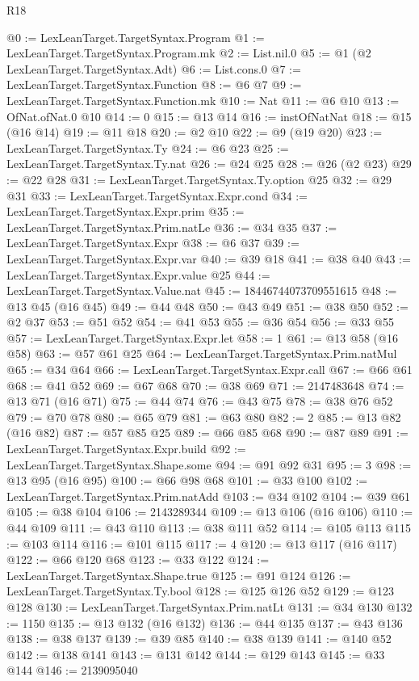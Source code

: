 \begin{lexlean}{R18}
\begin{coremodule}
@0 := LexLeanTarget.TargetSyntax.Program
@1 := LexLeanTarget.TargetSyntax.Program.mk
@2 := List.nil.{0}
@5 := @1 (@2 LexLeanTarget.TargetSyntax.Adt)
@6 := List.cons.{0}
@7 := LexLeanTarget.TargetSyntax.Function
@8 := @6 @7
@9 := LexLeanTarget.TargetSyntax.Function.mk
@10 := Nat
@11 := @6 @10
@13 := OfNat.ofNat.{0} @10
@14 := 0
@15 := @13 @14
@16 := instOfNatNat
@18 := @15 (@16 @14)
@19 := @11 @18
@20 := @2 @10
@22 := @9 (@19 @20)
@23 := LexLeanTarget.TargetSyntax.Ty
@24 := @6 @23
@25 := LexLeanTarget.TargetSyntax.Ty.nat
@26 := @24 @25
@28 := @26 (@2 @23)
@29 := @22 @28
@31 := LexLeanTarget.TargetSyntax.Ty.option @25
@32 := @29 @31
@33 := LexLeanTarget.TargetSyntax.Expr.cond
@34 := LexLeanTarget.TargetSyntax.Expr.prim
@35 := LexLeanTarget.TargetSyntax.Prim.natLe
@36 := @34 @35
@37 := LexLeanTarget.TargetSyntax.Expr
@38 := @6 @37
@39 := LexLeanTarget.TargetSyntax.Expr.var
@40 := @39 @18
@41 := @38 @40
@43 := LexLeanTarget.TargetSyntax.Expr.value @25
@44 := LexLeanTarget.TargetSyntax.Value.nat
@45 := 18446744073709551615
@48 := @13 @45 (@16 @45)
@49 := @44 @48
@50 := @43 @49
@51 := @38 @50
@52 := @2 @37
@53 := @51 @52
@54 := @41 @53
@55 := @36 @54
@56 := @33 @55
@57 := LexLeanTarget.TargetSyntax.Expr.let
@58 := 1
@61 := @13 @58 (@16 @58)
@63 := @57 @61 @25
@64 := LexLeanTarget.TargetSyntax.Prim.natMul
@65 := @34 @64
@66 := LexLeanTarget.TargetSyntax.Expr.call
@67 := @66 @61
@68 := @41 @52
@69 := @67 @68
@70 := @38 @69
@71 := 2147483648
@74 := @13 @71 (@16 @71)
@75 := @44 @74
@76 := @43 @75
@78 := @38 @76 @52
@79 := @70 @78
@80 := @65 @79
@81 := @63 @80
@82 := 2
@85 := @13 @82 (@16 @82)
@87 := @57 @85 @25
@89 := @66 @85 @68
@90 := @87 @89
@91 := LexLeanTarget.TargetSyntax.Expr.build
@92 := LexLeanTarget.TargetSyntax.Shape.some
@94 := @91 @92 @31
@95 := 3
@98 := @13 @95 (@16 @95)
@100 := @66 @98 @68
@101 := @33 @100
@102 := LexLeanTarget.TargetSyntax.Prim.natAdd
@103 := @34 @102
@104 := @39 @61
@105 := @38 @104
@106 := 2143289344
@109 := @13 @106 (@16 @106)
@110 := @44 @109
@111 := @43 @110
@113 := @38 @111 @52
@114 := @105 @113
@115 := @103 @114
@116 := @101 @115
@117 := 4
@120 := @13 @117 (@16 @117)
@122 := @66 @120 @68
@123 := @33 @122
@124 := LexLeanTarget.TargetSyntax.Shape.true
@125 := @91 @124
@126 := LexLeanTarget.TargetSyntax.Ty.bool
@128 := @125 @126 @52
@129 := @123 @128
@130 := LexLeanTarget.TargetSyntax.Prim.natLt
@131 := @34 @130
@132 := 1150
@135 := @13 @132 (@16 @132)
@136 := @44 @135
@137 := @43 @136
@138 := @38 @137
@139 := @39 @85
@140 := @38 @139
@141 := @140 @52
@142 := @138 @141
@143 := @131 @142
@144 := @129 @143
@145 := @33 @144
@146 := 2139095040

\end{coremodule}
\end{lexlean}
